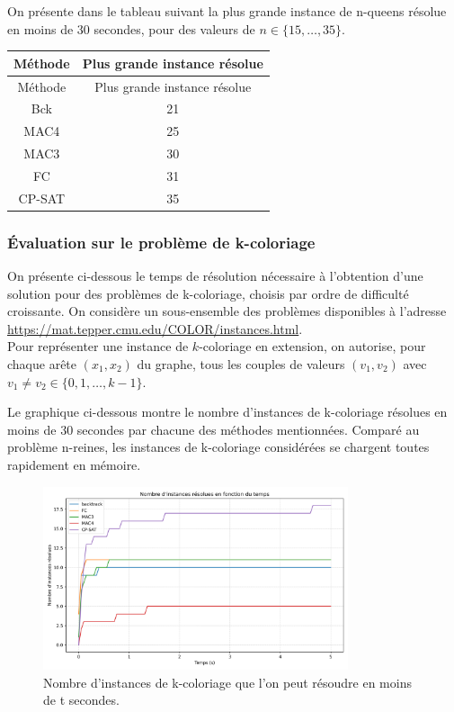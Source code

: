 \documentclass[14pt]{article}
\begin{document}
On présente dans le tableau suivant la plus grande instance de n-queens résolue en moins de 30 secondes, pour des valeurs de $n \in \{15,\dots,35\}$.

\begin{longtable}{|c|c|}
	\hline
	Méthode & Plus grande instance résolue \\
	\hline
	\endfirsthead
	
	Méthode & Plus grande instance résolue \\
	\hline
	\endhead
	
	\hline
	\endfoot
	
	\hline
	\endlastfoot
	
	Bck  & 21 \\
	MAC4  & 25 \\
	MAC3  & 30 \\
	FC  & 31 \\
	CP-SAT  & 35 \\
\end{longtable}

\subsubsection{Évaluation sur le problème de k-coloriage}

On présente ci-dessous le temps de résolution nécessaire à l'obtention d'une solution pour des problèmes de k-coloriage, choisis par ordre de difficulté croissante. On considère un sous-ensemble des problèmes disponibles à l'adresse \href{https://mat.tepper.cmu.edu/COLOR/instances.html}{https://mat.tepper.cmu.edu/COLOR/instances.html}.\\

Pour représenter une instance de $k$-coloriage en extension, on autorise, pour chaque arête $(x_1,x_2)$ du graphe, tous les couples de valeurs $(v_1,v_2)$ avec $v_1 \neq v_2 \in \{0,1,\dots,k-1\}$.

Le graphique ci-dessous montre le nombre d'instances de k-coloriage résolues en moins de 30 secondes par chacune des méthodes mentionnées. Comparé au problème n-reines, les instances de k-coloriage considérées se chargent toutes rapidement en mémoire.

\begin{figure}[H]
	\centering
	\includegraphics[width=0.8\textwidth]{Images/coloring1.png}
	\caption{Nombre d'instances de k-coloriage que l'on peut résoudre en moins de t secondes.}
	\label{fig:coloring1}
\end{figure}
\end{document}
